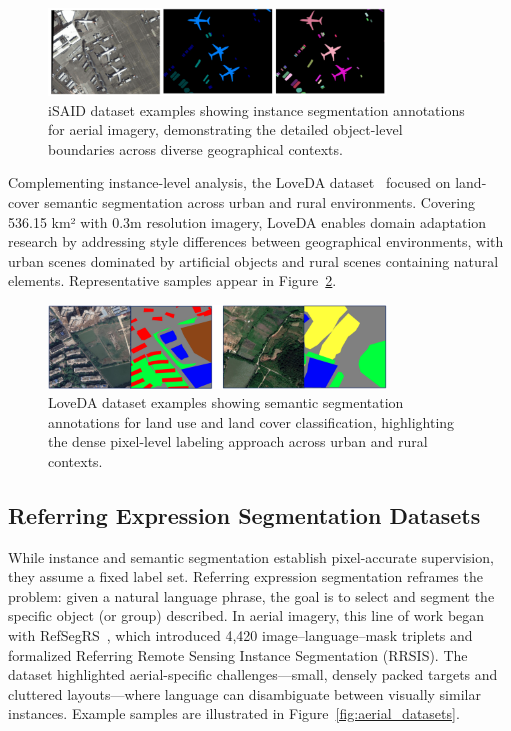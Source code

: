 \begin{figure}[t]
\centering
\includegraphics[width=0.8\textwidth]{Images/isaid_examples.png}
\caption{iSAID dataset examples showing instance segmentation annotations for aerial imagery, demonstrating the detailed object-level boundaries across diverse geographical contexts.}
\label{fig:isaid_examples}
\end{figure}

Complementing instance-level analysis, the LoveDA dataset~\cite{wang2021loveda} focused on land-cover semantic segmentation across urban and rural environments. Covering 536.15 km² with 0.3m resolution imagery, LoveDA enables domain adaptation research by addressing style differences between geographical environments, with urban scenes dominated by artificial objects and rural scenes containing natural elements. Representative samples appear in Figure~\ref{fig:loveda_examples}.

\begin{figure}[t]
\centering
\includegraphics[width=0.8\textwidth]{Images/loveda.png}
\caption{LoveDA dataset examples showing semantic segmentation annotations for land use and land cover classification, highlighting the dense pixel-level labeling approach across urban and rural contexts.}
\label{fig:loveda_examples}
\end{figure}

\subsection{Referring Expression Segmentation Datasets}

While instance and semantic segmentation establish pixel-accurate supervision, they assume a fixed label set. Referring expression segmentation reframes the problem: given a natural language phrase, the goal is to select and segment the specific object (or group) described. In aerial imagery, this line of work began with RefSegRS~\cite{yuan2023rrsis}, which introduced 4,420 image–language–mask triplets and formalized Referring Remote Sensing Instance Segmentation (RRSIS). The dataset highlighted aerial-specific challenges—small, densely packed targets and cluttered layouts—where language can disambiguate between visually similar instances. Example samples are illustrated in Figure~\ref{fig:aerial_datasets}.

